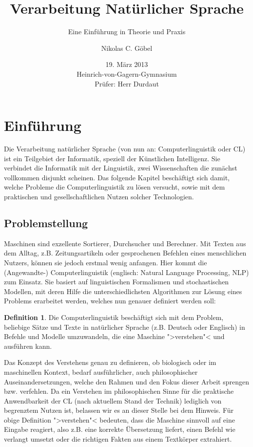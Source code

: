 \documentclass[12pt,a4paper]{article}
\title{Verarbeitung Natürlicher Sprache}
\subtitle{Eine Einführung in Theorie und Praxis}
\author{Nikolas C. Göbel}
\date{19. März 2013\\Heinrich-von-Gagern-Gymnasium\\Prüfer: Herr Durdaut}
\theoremstyle{definition}
\begin{document}
\maketitle
\thispagestyle{empty}
\newpage

\tableofcontents
\newpage

\onehalfspacing

\section{Einführung}
	Die Verarbeitung natürlicher Sprache (von nun an: Computerlinguistik oder CL) ist ein Teilgebiet der Informatik, speziell der Künstlichen Intelligenz. Sie verbindet die Informatik mit der Linguistik, zwei Wissenschaften die zunächst vollkommen disjunkt scheinen. Das folgende Kapitel beschäftigt sich damit, welche Probleme die Computerlinguistik zu lösen versucht, sowie mit dem praktischen und gesellschaftlichen Nutzen solcher Technologien.

	\subsection{Problemstellung}
		Maschinen sind exzellente Sortierer, Durchsucher und Berechner. Mit Texten aus dem Alltag, z.B. Zeitungsartikeln oder gesprochenen Befehlen eines menschlichen Nutzers, können sie jedoch erstmal wenig anfangen. Hier kommt die (Angewandte-) Computerlinguistik (englisch: Natural Language Processing, NLP) zum Einsatz. Sie basiert auf linguistischen Formalismen und stochastischen Modellen, mit deren Hilfe die unterschiedlichsten Algorithmen zur Lösung eines Problems erarbeitet werden, welches nun genauer definiert werden soll:

			\newtheorem{nlp}{Definition}[subsection]
			\begin{nlp}
				Die Computerlinguistik beschäftigt sich mit dem Problem, beliebige
				Sätze und Texte in natürlicher Sprache (z.B. Deutsch oder  Englisch) in
				Befehle und Modelle umzuwandeln, die eine Maschine ">verstehen"< und ausführen kann.
			\end{nlp}

		Das Konzept des Verstehens genau zu definieren, ob biologisch oder im maschinellen Kontext, bedarf ausführlicher, auch philosophischer Auseinandersetzungen, welche den Rahmen und den Fokus dieser Arbeit sprengen bzw. verfehlen. Da ein Verstehen im philosophischen Sinne für die praktische Anwendbarkeit der CL (nach aktuellem Stand der Technik) lediglich von begrenztem Nutzen ist, belassen wir es an dieser Stelle bei dem Hinweis. Für obige Definition ">verstehen"< bedeuten, dass die Maschine sinnvoll auf eine Eingabe reagiert, also z.B. eine korrekte Übersetzung liefert, einen Befehl wie verlangt umsetzt oder die richtigen Fakten aus einem Textkörper extrahiert.
\end{document}
